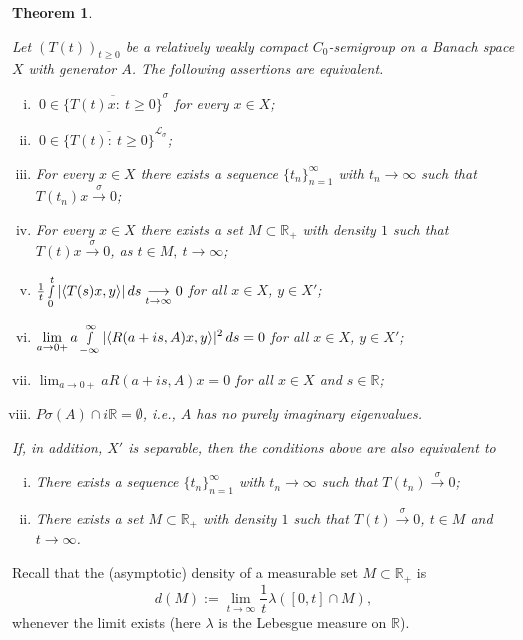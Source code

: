 \documentclass[11pt,intlimits, draft,oneside]{amsart}
\newtheorem{thm}{Theorem}[section]
\theoremstyle{definition}
\newtheorem{defi}[thm]{Definition}
\def\dd{\,d}
\def\Psigma{P\sigma}
\def\LLL{\mathcal{L}}
\def\RR{\mathbb{R}}
\begin{document}
\begin{thm}\label{str.stable_1}\rule{0pt}{0pt}
Let  $(T(t))_{t \geq 0}$ be a relatively weakly compact
$C_0$-semigroup on a Banach space $X$ with generator $A$.
%
The following assertions are equivalent.
\begin{enumerate}[(i)]
%
\item[(i)] $\ 0\in \overline{\{T(t)x:\:t\geq 0\}}^{\sigma}$ for every $x\in X$;

\item[(i')] $\ 0\in \overline{\{T(t):\:t\geq 0\}}^{\LLL_\sigma}$;

\item[(ii)]  For every $x\in X$ there exists a sequence $\{t_n\}_{n=1}^\infty$
with $t_n\to \infty$ such that $T(t_n)x \stackrel{\sigma}{\to} 0$;

\item[(iii)]  For every $x\in X$ there exists a set $M\subset \RR_+$ with
density $1$ such that $T(t)x\stackrel{\sigma}{\to} 0$, as $t\in
M,\:t\to \infty$;
%
\item[(iv)] $\displaystyle \tfrac{1}{t}\smallint_0^t |\langle T(s)x,y\rangle | \dd s \underset{{t\to \infty}}{\longrightarrow} 0$
for all $x\in X$, $y\in X'$;
%
\item[(v)] $\displaystyle \lim_{ a \to 0+} a \smallint_{-\infty}^\infty | \langle R(a+i s,A)x,y \rangle |^2
\dd s = 0$  for all $x\in X$, $y\in X'$;
%
\item[(vi)] $\displaystyle \lim_{a\to 0+} a R(a+i s,A)x = 0$ for all $x\in X$ and $s\in \RR$;
%
\item[(vii)] $\Psigma (A)\cap i\RR = \emptyset$, i.e., $A$ has no purely imaginary eigenvalues.
\end{enumerate}
If, in addition, $X'$ is separable, then the conditions above are
also equivalent to
\begin{enumerate}[(i)]
\item[(ii$^*$)] There exists a sequence $\{t_n\}_{n=1}^\infty$ with $t_n\to \infty$ such that
$T(t_n)\stackrel{\sigma}{\to} 0$;
%
\item[(iii$^*$)] There exists a set $M\subset \RR_+$ with density $1$ such that
$T(t)\stackrel{\sigma}{\to}0$, $t\in M$ and $t\to\infty$.
%
\end{enumerate}
\end{thm}
Recall that the (asymptotic) density of a measurable set $M\subset
\RR_+$ is
\begin{equation*}d(M):=\lim_{t\to \infty} \frac{1}{t} \lambda ([0,t]\cap M),\end{equation*}
whenever the limit exists (here $\lambda$ is the Lebesgue measure on
$\RR$). 
%
\end{document}
